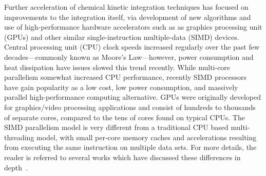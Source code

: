 \documentclass[preprint]{elsarticle}
\begin{document}
Further acceleration of chemical kinetic integration techniques has focused on improvements to the integration itself, via development of new algorithms and use of high-performance hardware accelerators such as as graphics processing unit (GPUs) and other similar single-instruction multiple-data (SIMD) devices.
Central processing unit (CPU) clock speeds increased regularly over the past few decades---commonly known as Moore's Law---however, power consumption and heat dissipation have issues slowed this trend recently.
While multi-core parallelism somewhat increased CPU performance, recently SIMD processors have gain popularity as a low cost, low power consumption, and massively parallel high-performance computing alternative.
GPUs were originally developed for graphics\slash video processing applications and consist of hundreds to thousands of separate cores, compared to the tens of cores found on typical CPUs.
The SIMD parallelism model is very different from a traditional CPU based multi-threading model, with small per-core memory caches and accelerations resulting from executing the same instruction on multiple data sets.
For more details, the reader is referred to several works which have discussed these differences in depth~\cite{Cruz:2011gc,Brodtkorb:2013hn,Niemeyer:2014hn}.
\end{document}
